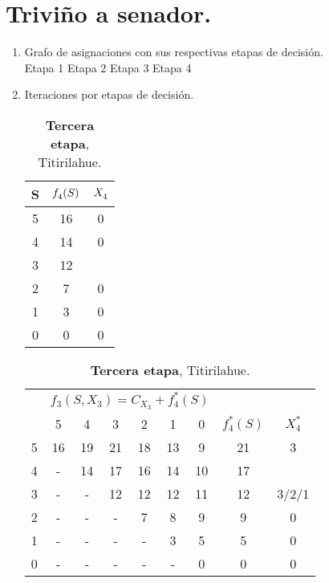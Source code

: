 \section{Triviño a senador.}
\begin{enumerate}
\item
	Grafo de asignaciones con sus respectivas etapas de decisión.\\
	{\medskip}
	Etapa 1 \hfill Etapa 2 \hfill Etapa 3 \hfill Etapa 4
	\begin{center}
	
	\end{center}
	\newpage
\item
	Iteraciones por etapas de decisión.\\
	\begin{table}[ht]
		\caption{\textbf{Cuarta etapa}, Titirileufú.}
		\centering
		\begin{tabular}{ |c|c|c| }                 
		\hline\hline
		S & $f^{\*}_4(S)$ & $X^{\*}_4$ \\
		\hline
		5 & 16 & 0\\
		4 & 14 & 0\\
		3 & 12 & \rojo{0}\\
		2 & 7  & 0\\
		1 & 3  & 0\\
		0 & 0  & 0\\
		\hline 
		\end{tabular}
		\caption{\textbf{Tercera etapa}, Titirilahue.}
		\centering
		\begin{tabular}{ |c|cccccc|cc| }                 
		\hline
		 & \multicolumn{6}{c|}{$f_3(S,X_3) = C_{X_3} + f^{*}_4(S)$} & & \\
		\diagbox{S}{$X_3$} &5&4&3&2&1&0& $f^{*}_4(S)$ & $X^{*}_4$ \\
		\hline
		5 & 16 & 19 & 21 & 18 & 13 & 9 & 21 & 3\\
		4 & - & 14 & 17 & 16 & 14 & 10 & 17 & \rojo{3}\\
		3 & - & - & 12 & 12 & 12 & 11 & 12 & 3/2/1\\
		2 & - & - & - & 7 & 8 & 9 & 9 & 0\\
		1 & - & - & - & - & 3 & 5 & 5 & 0\\
		0 & - & - & - & - & - & 0 & 0 & 0\\
		\hline 
		\end{tabular}

\end{table}
\end{enumerate}
